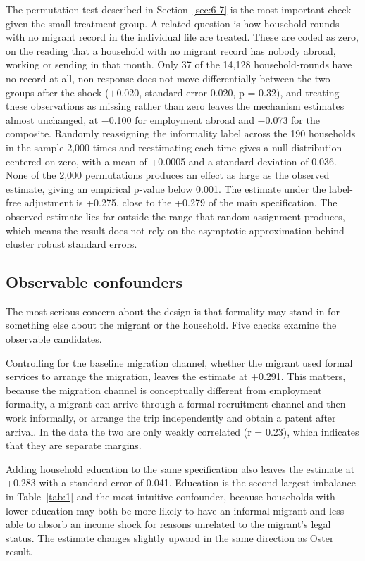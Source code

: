 The permutation test described in Section~\ref{sec:6-7} is the most important check given the small treatment group. A related question is how household-rounds with no migrant record in the individual file are treated. These are coded as zero, on the reading that a household with no migrant record has nobody abroad, working or sending in that month. Only 37 of the 14,128 household-rounds have no record at all, non-response does not move differentially between the two groups after the shock ($+$0.020, standard error 0.020, p = 0.32), and treating these observations as missing rather than zero leaves the mechanism estimates almost unchanged, at $-$0.100 for employment abroad and $-$0.073 for the composite. Randomly reassigning the informality label across the 190 households in the sample 2,000 times and reestimating each time gives a null distribution centered on zero, with a mean of +0.0005 and a standard deviation of 0.036. None of the 2,000 permutations produces an effect as large as the observed estimate, giving an empirical p-value below 0.001. The estimate under the label-free adjustment is +0.275, close to the +0.279 of the main specification. The observed estimate lies far outside the range that random assignment produces, which means the result does not rely on the asymptotic approximation behind cluster robust standard errors.

\subsection{Observable confounders}\label{sec:8-3}

The most serious concern about the design is that formality may stand in for something else about the migrant or the household. Five checks examine the observable candidates.

Controlling for the baseline migration channel, whether the migrant used formal services to arrange the migration, leaves the estimate at +0.291. This matters, because the migration channel is conceptually different from employment formality, a migrant can arrive through a formal recruitment channel and then work informally, or arrange the trip independently and obtain a patent after arrival. In the data the two are only weakly correlated (r = 0.23), which indicates that they are separate margins.

Adding household education to the same specification also leaves the estimate at +0.283 with a standard error of 0.041. Education is the second largest imbalance in Table~\ref{tab:1} and the most intuitive confounder, because households with lower education may both be more likely to have an informal migrant and less able to absorb an income shock for reasons unrelated to the migrant's legal status. The estimate changes slightly upward in the same direction as Oster result.

